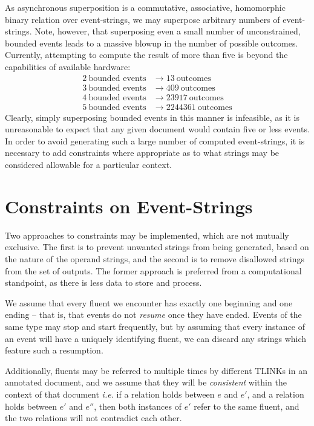 \documentclass[a4paper,11pt]{article}
\begin{document}
As asynchronous superposition is a commutative, associative, homomorphic binary 
relation over \iffalse{}well-formed\fi{}event-strings, we may superpose 
arbitrary numbers of event-strings. Note, however, that superposing even a 
small number of unconstrained, bounded events leads to a massive blowup in the 
number of possible outcomes. Currently, attempting to compute the result of 
more than five is beyond the capabilities of available hardware:
\begin{align*}
2 ~\mbox{bounded events} &\to 13 ~\mbox{outcomes}\\
3 ~\mbox{bounded events} &\to 409 ~\mbox{outcomes}\\
4 ~\mbox{bounded events} &\to 23917 ~\mbox{outcomes}\\
5 ~\mbox{bounded events} &\to 2244361 ~\mbox{outcomes}
\end{align*}
Clearly, simply superposing bounded events in this manner is infeasible, as it 
is unreasonable to expect that any given document would contain five or less 
events. In order to avoid generating such a large number of computed 
event-strings, it is necessary to add constraints where appropriate as to what 
strings may be considered allowable for a particular context.

\section{Constraints on Event-Strings}
Two approaches to constraints may be implemented, which are not mutually 
exclusive. The first is to prevent unwanted strings from being generated, based 
on the nature of the operand strings, and the second is to remove disallowed 
strings from the set of outputs. The former approach is preferred from a 
computational standpoint, as there is less data to store and process.

We assume that every fluent we encounter has exactly one beginning and one 
ending -- that is, that events do not \textit{resume} once they have ended. 
Events of the same type may stop and start frequently, but by assuming that 
every instance of an event will have a uniquely identifying fluent, we can 
discard any strings which feature such a resumption.

Additionally, fluents 
may be referred to multiple times by different TLINKs in an annotated document, 
and we assume that they will be \textit{consistent} within the context of that 
document \textit{i.e.} if a relation holds between $e$ and $e'$, and a relation 
holds between $e'$ and $e''$, then both instances of $e'$ refer to the same 
fluent, and the two relations will not contradict each other.
\end{document}
